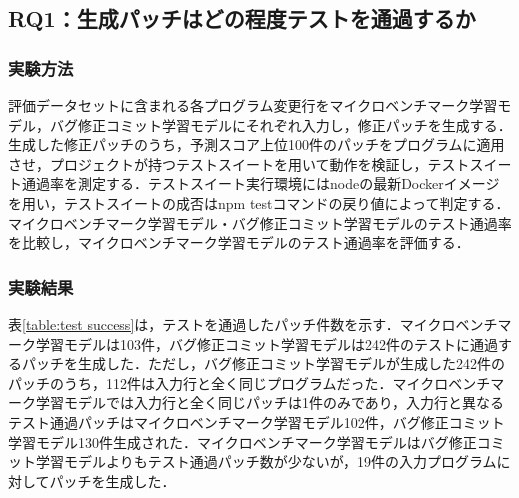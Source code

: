 \documentclass[submit,ses,noauthor]{ipsj}
\begin{document}
\subsection{RQ1：生成パッチはどの程度テストを通過するか}

\subsubsection{実験方法}

評価データセットに含まれる各プログラム変更行をマイクロベンチマーク学習モデル，バグ修正コミット学習モデルにそれぞれ入力し，修正パッチを生成する．生成した修正パッチのうち，予測スコア上位100件のパッチをプログラムに適用させ，プロジェクトが持つテストスイートを用いて動作を検証し，テストスイート通過率を測定する．テストスイート実行環境にはnodeの最新Dockerイメージを用い，テストスイートの成否はnpm testコマンドの戻り値によって判定する．マイクロベンチマーク学習モデル・バグ修正コミット学習モデルのテスト通過率を比較し，マイクロベンチマーク学習モデルのテスト通過率を評価する．

\subsubsection{実験結果}

表\ref{table:test success}は，テストを通過したパッチ件数を示す．マイクロベンチマーク学習モデルは103件，バグ修正コミット学習モデルは242件のテストに通過するパッチを生成した．ただし，バグ修正コミット学習モデルが生成した242件のパッチのうち，112件は入力行と全く同じプログラムだった．マイクロベンチマーク学習モデルでは入力行と全く同じパッチは1件のみであり，入力行と異なるテスト通過パッチはマイクロベンチマーク学習モデル102件，バグ修正コミット学習モデル130件生成された．マイクロベンチマーク学習モデルはバグ修正コミット学習モデルよりもテスト通過パッチ数が少ないが，19件の入力プログラムに対してパッチを生成した．


\begin{table}[t]
  \caption{RQ1：テストを通過したパッチ件数（Top-100）}
  \label{table:test success}
  \centering
  \vspace{-4mm}
\end{table}
\end{document}
